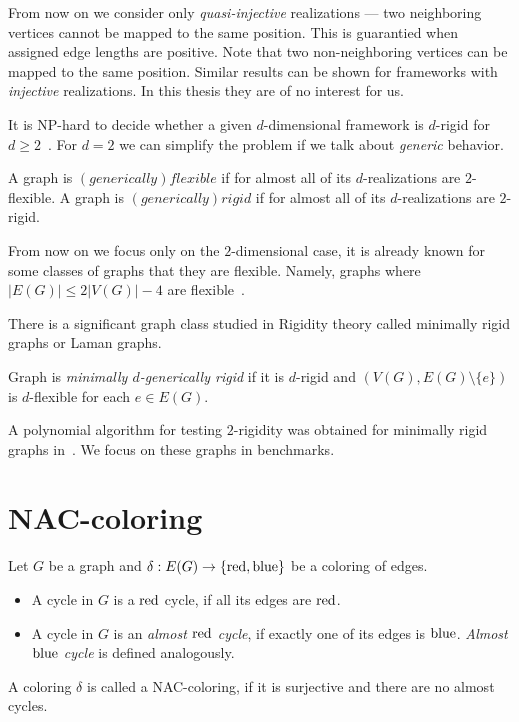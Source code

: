 From now on we consider only \emph{quasi-injective} realizations ---
two neighboring vertices cannot be mapped to the same position.
This is guarantied when assigned edge lengths are positive.
Note that two non-neighboring vertices can be mapped to the same position.
Similar results can be shown for frameworks with \emph{injective} realizations.
In this thesis they are of no interest for us.

It is NP-hard to decide whether a given \( d \)-dimensional framework is
\( d \)-rigid for \( d \ge 2 \)~\cite{d_rigidity_hardness}.
For \( d = 2 \) we can simplify the problem if we talk about \emph{generic}
behavior.
%
\begin{definition}
	A graph is \( (generically) flexible \) if for almost all of
	its \( d \)-realizations are \( 2 \)-flexible.
	A graph is \( (generically) rigid \) if for almost all of
	its \( d \)-realizations are \( 2 \)-rigid.
\end{definition}
%

From now on we focus only on the \( 2 \)-dimensional case,
it is already known for some classes of graphs that they are flexible.
Namely, graphs where \( |E(G)| \le 2|V(G)| - 4 \)
are flexible~\cite{stable_cuts_2v_4}.

There is a significant graph class studied in Rigidity theory
called minimally rigid graphs or Laman graphs.
%
\begin{definition}
	Graph is \emph{minimally \( d \)-generically rigid} if it is \( d \)-rigid
	and \( (V(G), E(G) \setminus \{e\}) \) is \(d\)-flexible for each \( e \in E(G) \).
\end{definition}
%

A polynomial algorithm for testing \( 2 \)-rigidity was obtained
for minimally rigid graphs in~\cite{polynomial-min-rigid}.
We focus on these graphs in benchmarks.

\section{NAC-coloring}

\begin{definition}
	Let \( G \) be a graph and \( \delta: E(G) \to \{ \text{red}, \text{blue} \} \)
	be a coloring of edges.
	\begin{itemize}
		\item A cycle in \( G \) is a \( \text{red} \) cycle, if all its edges are \( \text{red} \).
		\item A cycle in \( G \) is an \emph{almost \( \text{red} \) cycle},
		      if exactly one of its edges is \( \text{blue} \).
		      \emph{Almost \( \text{blue} \) cycle} is defined analogously.
	\end{itemize}
	A coloring \( \delta \) is called a NAC-coloring, if it is surjective
	and there are no almost cycles.
\end{definition}
%

